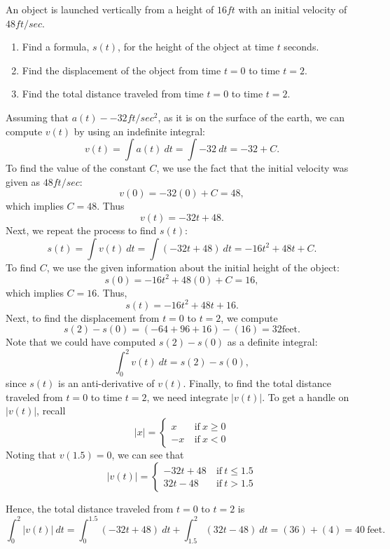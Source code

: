 \documentclass{ximera}
\begin{document}
\begin{example}
An object is launched vertically from a height of $16 ft$ with an initial velocity of $48 ft/sec$.  
\begin{enumerate}
\item Find a formula, $s(t)$, for the height of the object at time $t$
 seconds.
\item Find the displacement of the object from time $t = 0$ to time $t = 2$.
\item Find the total distance traveled from time $t = 0$ to time $t = 2$.
\end{enumerate}

Assuming that $a(t) - -32 ft/sec^2$, as it is on the surface of the earth, 
we can compute $v(t)$ by using an indefinite integral:
\[v(t) = \int a(t) \ dt = \int -32 \ dt = -32 + C.\]
To find the value of the constant $C$, we use the fact that the initial velocity was given as $48 ft/sec$:
\[v(0) = -32(0) + C = 48,\]
which implies $C = 48$.  Thus
\[v(t) = -32t + 48.\]
Next, we repeat the process to find $s(t)$:
\[s(t) = \int v(t) \ dt = \int (-32t + 48) \ dt = -16t^2 + 48t + C.\]
To find $C$, we use the given information about the initial height of the object:
\[s(0) = -16t^2 + 48(0) + C = 16,\]
which implies $C = 16$.  Thus,
\[s(t) = -16t^2 + 48t + 16.\]
Next, to find the displacement from $t= 0$ to $t = 2$, we compute
\[s(2) - s(0) = (-64+96+16)-(16) = 32 \text{feet}.\]
Note that we could have computed $s(2) - s(0)$ as a definite integral:
\[\int_0^2 v(t) \ dt = s(2) - s(0),\]
since $s(t)$ is an anti-derivative of $v(t)$.
Finally, to find the total distance traveled from $t = 0$ to time $t = 2$,
we need integrate $|v(t)|$. To get a handle on $|v(t)|$, recall
\[|x| = \left\{
     \begin{array}{rc}
       x & \ \text{if} \  x \geq 0 \\
			 -x & \ \text{if} \ x <0
     \end{array}
   \right.
\]
Noting that $v(1.5) = 0$, we can see that
\[|v(t)| = \left\{\begin{array}{rc}
       -32t + 48  &\ \text{if} \  t \leq 1.5 \\
			 32t - 48  &\ \text{if} \ t > 1.5
     \end{array}
   \right.
\]


Hence, the total distance traveled from $t=0$ to $t = 2$ is
\[\int_0^2 |v(t)| \ dt = \int_0^{1.5} (-32t + 48) \ dt + \int_{1.5}^2 (32t -48) \ dt = (36)+(4) = 40 \ \text{feet}.\]


\end{example}
\end{document}
